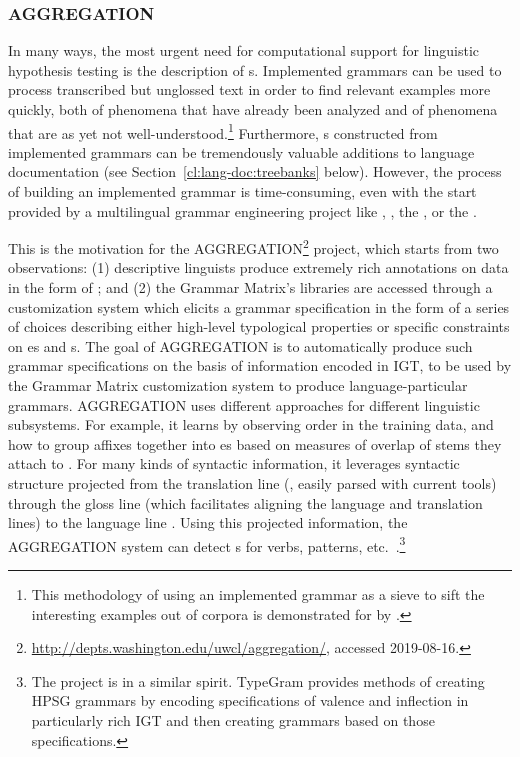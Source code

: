 \documentclass[output=paper,biblatex,babelshorthands,newtxmath,draftmode,colorlinks,citecolor=brown]{langscibook}
\begin{document}
\subsubsection{AGGREGATION}
\label{cl:lang-doc:aggr}

%
In many ways, the most urgent need for computational support for linguistic hypothesis testing is
the description of s. Implemented grammars can be used to process
transcribed but unglossed text in order to find relevant examples more quickly, both of phenomena
that have already been analyzed and of phenomena that are as yet not well-understood.\footnote{This
  methodology of using an implemented grammar as a sieve to sift the interesting examples out of
  corpora is demonstrated for  by \citet{Baldwin-et-al-05}.}  Furthermore,
s constructed from implemented grammars can be tremendously valuable additions to
language documentation (see Section~\ref{cl:lang-doc:treebanks} below). However, the process of
building an implemented grammar is time-consuming, even with the start provided by a multilingual
grammar engineering project like , 
\citep{BDKMR02a-u,Kin:For:Kuh:But:05}, the  \citep{Ranta:09}, or
the .

This is the motivation for the
AGGREGATION\footnote{\url{http://depts.washington.edu/uwcl/aggregation/}, accessed 2019-08-16.}
project, which starts from two observations: (1) descriptive linguists produce extremely rich
annotations on data in the form of ; and (2) the Grammar
Matrix's libraries are accessed through a customization system which elicits a grammar specification
in the form of a series of choices describing either high-level typological
properties or specific constraints on es and s.  The goal of
AGGREGATION is to automatically produce such grammar specifications on the basis of information
encoded in IGT, to be used by the Grammar Matrix customization system to produce language-particular
grammars. AGGREGATION uses different approaches for different linguistic subsystems. For example, it
learns  by observing
 order in the training data, and how to group affixes together into es based on measures of overlap of stems they attach to \citep{Wax:14,Zamaraeva:17}. For
many kinds of syntactic information, it leverages syntactic structure projected from the translation
line (, easily parsed with current tools) through the gloss line (which facilitates
aligning the language and translation lines) to the language line
\citep{Xia:Lew:07,Georgi:16}. Using this projected information, the AGGREGATION system can detect
s for verbs,  patterns, etc.\
\citep{Ben:Goo:Cro:Xia:13,Zam:How:Ben:19}.\footnote{The  project \citep{Hel:Bee:14} is
  in a similar spirit. TypeGram provides methods of creating HPSG grammars by encoding
  specifications of valence and inflection in particularly rich IGT and then creating grammars based
  on those specifications.}%
\end{document}
